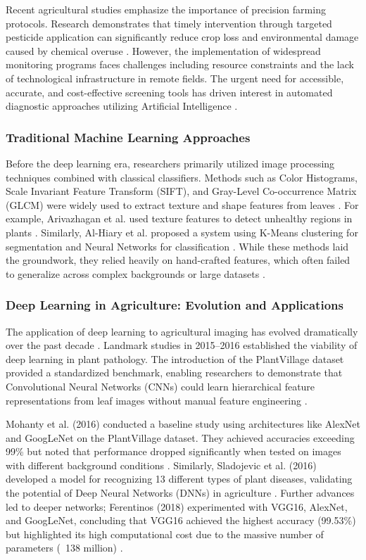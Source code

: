 Recent agricultural studies emphasize the importance of precision farming protocols. Research demonstrates that timely intervention through targeted pesticide application can significantly reduce crop loss and environmental damage caused by chemical overuse \cite{savary2019global}. However, the implementation of widespread monitoring programs faces challenges including resource constraints and the lack of technological infrastructure in remote fields. The urgent need for accessible, accurate, and cost-effective screening tools has driven interest in automated diagnostic approaches utilizing Artificial Intelligence \cite{lecun2015deep}.

\subsubsection{Traditional Machine Learning Approaches}
Before the deep learning era, researchers primarily utilized image processing techniques combined with classical classifiers. Methods such as Color Histograms, Scale Invariant Feature Transform (SIFT), and Gray-Level Co-occurrence Matrix (GLCM) were widely used to extract texture and shape features from leaves \cite{pujari2016image}. For example, Arivazhagan et al. used texture features to detect unhealthy regions in plants \cite{arivazhagan2013detection}. Similarly, Al-Hiary et al. proposed a system using K-Means clustering for segmentation and Neural Networks for classification \cite{alhiary2011fast}. While these methods laid the groundwork, they relied heavily on hand-crafted features, which often failed to generalize across complex backgrounds or large datasets \cite{ngugi2021recent}.

\subsubsection{Deep Learning in Agriculture: Evolution and Applications}
The application of deep learning to agricultural imaging has evolved dramatically over the past decade \cite{mohanty2016using}. Landmark studies in 2015--2016 established the viability of deep learning in plant pathology. The introduction of the PlantVillage dataset provided a standardized benchmark, enabling researchers to demonstrate that Convolutional Neural Networks (CNNs) could learn hierarchical feature representations from leaf images without manual feature engineering \cite{hughes2015open}.

Mohanty et al. (2016) conducted a baseline study using architectures like AlexNet and GoogLeNet on the PlantVillage dataset. They achieved accuracies exceeding 99\% but noted that performance dropped significantly when tested on images with different background conditions \cite{mohanty2016using}. Similarly, Sladojevic et al. (2016) developed a model for recognizing 13 different types of plant diseases, validating the potential of Deep Neural Networks (DNNs) in agriculture \cite{sladojevic2016deep}. Further advances led to deeper networks; Ferentinos (2018) experimented with VGG16, AlexNet, and GoogLeNet, concluding that VGG16 achieved the highest accuracy (99.53\%) but highlighted its high computational cost due to the massive number of parameters (~138 million) \cite{ferentinos2018deep}.

